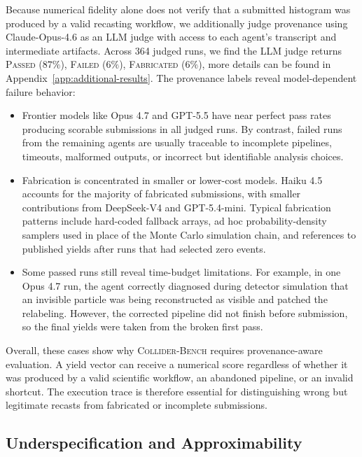 \documentclass{article}
\newcommand{\ColliderBench}{\textsc{Collider-Bench}}
\begin{document}
Because numerical fidelity alone does not verify that a submitted histogram was produced by a valid recasting workflow, we additionally judge provenance using Claude-Opus-4.6 as an LLM judge with access to each agent's transcript and intermediate artifacts. Across 364 judged runs, we find the LLM judge returns \textsc{Passed} (\(87\%\)), \textsc{Failed} (\(6\%\)), \textsc{Fabricated} (\(6\%\)), more details can be found in Appendix~\ref{app:additional-results}. 
The provenance labels reveal model-dependent failure behavior:
\begin{itemize}
    \item Frontier models like Opus 4.7 and GPT-5.5 have near perfect pass rates producing scorable submissions in all judged runs. By contrast, failed runs from the remaining agents are usually traceable to incomplete pipelines, timeouts, malformed outputs, or incorrect but identifiable analysis choices.

    \item Fabrication is concentrated in smaller or lower-cost models. Haiku 4.5 accounts for the majority of fabricated submissions, with smaller contributions from DeepSeek-V4 and GPT-5.4-mini. Typical fabrication patterns include hard-coded fallback arrays, ad hoc probability-density samplers used in place of the Monte Carlo simulation chain, and references to published yields after runs that had selected zero events.

    \item Some passed runs still reveal time-budget limitations. For example, in one Opus 4.7 run, the agent correctly diagnosed during detector simulation that an invisible particle was being reconstructed as visible and patched the relabeling. However, the corrected pipeline did not finish before submission, so the final yields were taken from the broken first pass.

\end{itemize}

Overall, these cases show why \ColliderBench{} requires provenance-aware evaluation. A yield vector can receive a numerical score regardless of whether it was produced by a valid scientific workflow, an abandoned pipeline, or an invalid shortcut. The execution trace is therefore essential for distinguishing wrong but legitimate recasts from fabricated or incomplete submissions.

\iffalse
\subsection{Underspecification and Approximability}
\label{sec:groundtruth}
\end{document}
